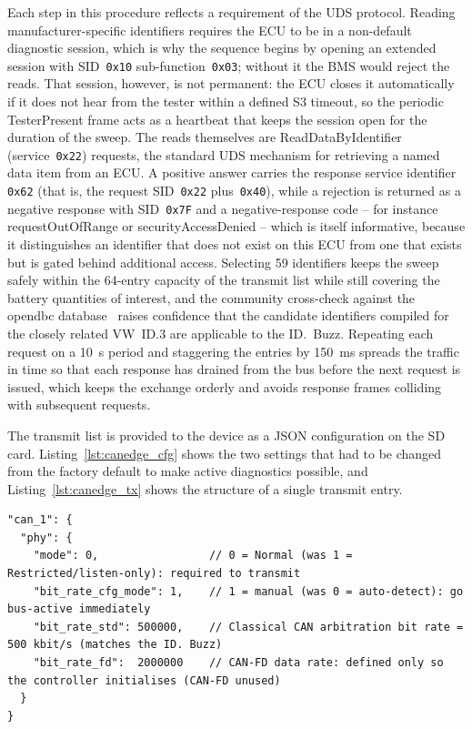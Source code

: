\documentclass[11pt,a4paper,oneside,parskip=half]{scrreprt}
\providecommand{\hex}{}\renewcommand{\hex}[1]{\texttt{0x#1}}
\begin{document}
Each step in this procedure reflects a requirement of the UDS protocol. Reading manufacturer-specific identifiers requires the ECU to be in a non-default diagnostic session, which is why the sequence begins by opening an extended session with SID~\hex{10} sub-function~\hex{03}; without it the BMS would reject the reads. That session, however, is not permanent: the ECU closes it automatically if it does not hear from the tester within a defined S3 timeout, so the periodic TesterPresent frame acts as a heartbeat that keeps the session open for the duration of the sweep. The reads themselves are ReadDataByIdentifier (service~\hex{22}) requests, the standard UDS mechanism for retrieving a named data item from an ECU. A positive answer carries the response service identifier \hex{62} (that is, the request SID~\hex{22} plus~\hex{40}), while a rejection is returned as a negative response with SID~\hex{7F} and a negative-response code -- for instance requestOutOfRange or securityAccessDenied -- which is itself informative, because it distinguishes an identifier that does not exist on this ECU from one that exists but is gated behind additional access. Selecting 59 identifiers keeps the sweep safely within the 64-entry capacity of the transmit list while still covering the battery quantities of interest, and the community cross-check against the opendbc database~\cite{opendbc} raises confidence that the candidate identifiers compiled for the closely related VW~ID.3 are applicable to the ID.~Buzz. Repeating each request on a 10~s period and staggering the entries by 150~ms spreads the traffic in time so that each response has drained from the bus before the next request is issued, which keeps the exchange orderly and avoids response frames colliding with subsequent requests.

The transmit list is provided to the device as a JSON configuration on the SD card. Listing~\ref{lst:canedge_cfg} shows the two settings that had to be changed from the factory default to make active diagnostics possible, and Listing~\ref{lst:canedge_tx} shows the structure of a single transmit entry.

\begin{lstlisting}[caption={CANedge2 PHY configuration changes required for UDS transmission. The factory default is restricted (listen-only) PHY mode with auto bit-rate detection, which never lets the controller transmit.},label={lst:canedge_cfg}]
"can_1": {
  "phy": {
    "mode": 0,                 // 0 = Normal (was 1 = Restricted/listen-only): required to transmit
    "bit_rate_cfg_mode": 1,    // 1 = manual (was 0 = auto-detect): go bus-active immediately
    "bit_rate_std": 500000,    // Classical CAN arbitration bit rate = 500 kbit/s (matches the ID. Buzz)
    "bit_rate_fd":  2000000    // CAN-FD data rate: defined only so the controller initialises (CAN-FD unused)
  }
}
\end{lstlisting}
\end{document}
